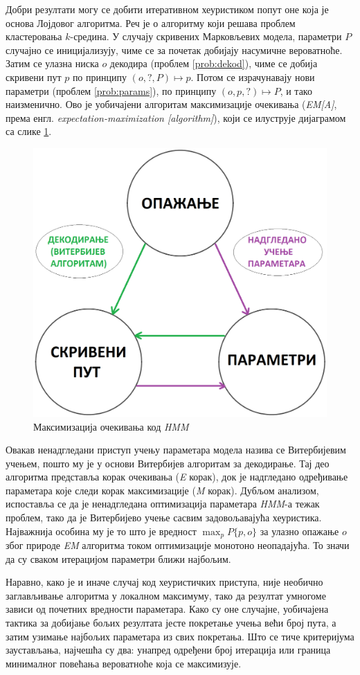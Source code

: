 \documentclass[12pt,oneside]{memoir}
\begin{document}
\begin{CJK}{UTF8}{ipxm}
Добри резултати могу се добити итеративном хеуристиком попут оне која је основа Лојдовог алгоритма. Реч је о алгоритму који решава проблем кластеровања $k$-средина. У случају скривених Марковљевих модела, параметри $P$ случајно се иницијализују, чиме се за почетак добијају насумичне вероватноће. Затим се улазна ниска $o$ декодира (проблем \ref{prob:dekod}), чиме се добија скривени пут $p$ по принципу $(o, ?, P) \mapsto p$. Потом се израчунавају нови параметри (проблем \ref{prob:params}), по принципу $(o, p, ?) \mapsto P$, и тако наизменично. Ово је уобичајени алгоритам максимизације очекивања (\textit{EM[A]}, према енгл. \textit{expectation-maximization [algorithm]}), који се илуструје дијаграмом са слике \ref{fig:ema}.

\begin{figure}[H]
  \centering
  \includegraphics[width=.65\textwidth]{ema.png}
  \caption{Максимизација очекивања код \textit{HMM}}
  \label{fig:ema}
\end{figure}

Овакав ненадгледани приступ учењу параметара модела назива се Витербијевим учењем, пошто му је у основи Витербијев алгоритам за декодирање. Тај део алгоритма представља корак очекивања (\textit{E} корак), док је надгледано одређивање параметара које следи корак максимизације (\textit{M} корак). Дубљом анализом, испоставља се да је ненадгледана оптимизација параметара \textit{HMM}-а тежак проблем, тако да је Витербијево учење сасвим задовољавајућа хеуристика. Најважнија особина му је то што је вредност $\max_p P\{p, o\}$ за улазно опажање $o$ због природе \textit{EM} алгоритма током оптимизације монотоно неопадајућа. То значи да су сваком итерацијом параметри ближи најбољим.

Наравно, како је и иначе случај код хеуристичких приступа, није необично заглављивање алгоритма у локалном максимуму, тако да резултат умногоме зависи од почетних вредности параметара. Како су оне случајне, уобичајена тактика за добијање бољих резултата јесте покретање учења већи број пута, а затим узимање најбољих параметара из свих покретања. Што се тиче критеријума заустављања, најчешћа су два: унапред одређени број итерација или граница минималног повећања вероватноће која се максимизује.


\end{CJK}
\end{document}
